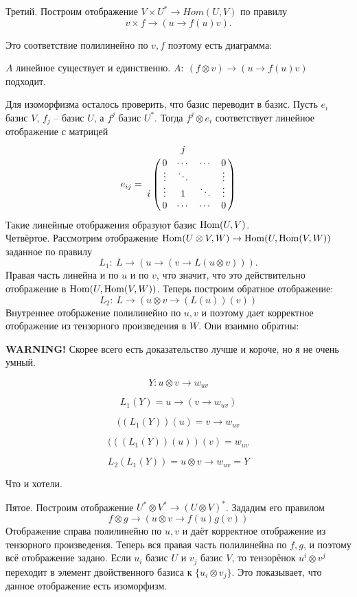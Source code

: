 		Третий. Построим отображение $V\times U^{*} \to Hom (U,V)$ по правилу $$v\times f \to (u \to f(u)v).$$

		Это соответствие полилинейно по $v,f$ поэтому есть диаграмма:

\begin{center}
\end{center}

		$A$ линейное существует и единственно. $A:\ (f\otimes v)\to (u\to f(u)v)$ подходит.

		Для изоморфизма осталось проверить, что базис переводит в базис. Пусть $e_i$ базис $V$, $f_j$ -- базис $U$, а $f^j$ базис $U^{*}$. Тогда $f^j\otimes e_i$ соответствует линейное отображение с матрицей 
$$ e_{ij}= \bordermatrix{
 & &j&& \cr
 &0&\cdots&\cdots&0\cr
 &\vdots&\ddots && \vdots\cr
i&\vdots& 1 & \ddots& \vdots\cr
 &0&\cdots& \cdots&0
}$$
		Такие линейные отображения образуют базис $\operatorname{Hom}(U,V)$.\\

		Четвёртое. Рассмотрим отображение $ \operatorname{Hom} (U\otimes V,  W) \to \operatorname{Hom} (U, \operatorname{Hom} (V,W))$ заданное по правилу 
		$$L_1:\ L \to (u \to (v \to L(u\otimes v))).$$
		Правая часть линейна и по $u$ и по $v$, что значит, что это действительно отображение в $\operatorname{Hom} (U, \operatorname{Hom} (V,W))$.
		Теперь построим обратное отображение: 
		$$L_2:\ L \to (u\otimes v \to (L(u))(v))$$
		Внутреннее отображение полилинейно по $u,v$ и поэтому дает корректное отображение из тензорного произведения в $W$. Они взаимно обратны:

		{\bf WARNING!} Скорее всего есть доказательство лучше и короче, но я не очень умный.

		$$Y: u\otimes v \to w_{uv}$$

		$$L_1(Y)=u\to (v\to w_{uv})$$

		$$((L_1(Y))(u) = v\to w_{uv}$$

		$$(((L_1(Y))(u))(v) = w_{uv}$$

		$$L_2(L_1(Y)) = u\otimes v \to w_{uv} = Y$$

		Что и хотели.

		Пятое. Построим отображение $U^{*}\otimes V^{*} \to (U \otimes V)^{*}$. Зададим его правилом
		$$f\otimes g \to (u\otimes v \to f(u)g(v))$$
		Отображение справа полилинейно по $u,v$ и даёт корректное отображение из тензорного произведения. Теперь вся правая часть полилинейна по $f,g$, и поэтому всё отображение задано. Если $u_i$ базис $U$ и $v_j$ базис $V$, то тензорёнок $u^i\otimes v^j$  переходит в элемент двойственного базиса к $\{u_i\otimes v_j\}$. Это показывает, что данное отображение есть изоморфизм. 

	\endproof 
\ethrm